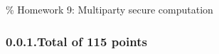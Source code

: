 \documentclass{article}
\begin{document}
\noindent{}\% Homework 9: Multiparty secure computation%

\newcommand{\zo}{\{0,1\}}
\newcommand{\E}{\mathbb{E}}
\newcommand{\Z}{\mathbb{Z}}
\newcommand{\getsr}{\leftarrow_R\;}
\newcommand{\Gp}{\mathbb{G}}
\newcommand{\iprod}[1]{\langle #1 \rangle}
\newcommand{\Epubcca}{E^{pub,cca}}
\newcommand{\Epubcpa}{E^{pub,cpa}}
\newcommand{\Epriv}{E^{priv,cca}}
\newcommand{\Sign}{S}
\newcommand{\Ver}{V}

\newcommand{\floor}[1]{\lfloor #1 \rfloor}
\newcommand{\ceil}[1]{\lceil #1 \rceil}

\newcommand{\cF}{\mathcal{F}}

\newcommand{\onand}{\overline{\wedge}}
\subsubsection{0.0.1.\hspace*{0.5em}Total of 115 points}\label{sec-total-of-115-points}%
\end{document}
